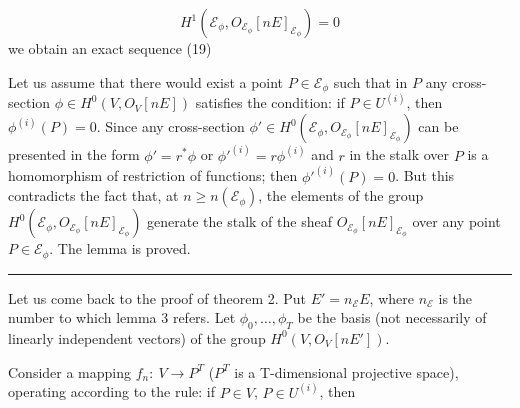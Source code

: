 \[
H^1(\mathcal E_\phi,O_{\mathcal E_\phi}[nE]_{\mathcal E_\phi})=0
\]
we obtain an exact sequence
\hfill(19)

Let us assume that there would exist a point $P\in\mathcal E_\phi$ such that in $P$ any cross-section $\phi\in H^0(V,O_V[nE])$ satisfies the condition: if $P\in U^{(i)}$, then $\phi^{(i)}(P)=0$. Since any cross-section $\phi'\in H^0(\mathcal E_\phi,O_{\mathcal E_\phi}[nE]_{\mathcal E_\phi})$ can be presented in the form $\phi'=r^*\phi$ or $\phi'^{(i)}=r\phi^{(i)}$ and $r$ in the stalk over $P$ is a homomorphism of restriction of functions; then $\phi'^{(i)}(P)=0$. But this contradicts the fact that, at $n\ge n(\mathcal E_\phi)$, the elements of the group $H^0(\mathcal E_\phi,O_{\mathcal E_\phi}[nE]_{\mathcal E_\phi})$ generate the stalk of the sheaf $O_{\mathcal E_\phi}[nE]_{\mathcal E_\phi}$ over any point $P\in\mathcal E_\phi$. The lemma is proved.\ \rule{0.5em}{1em}

Let us come back to the proof of theorem 2. Put $E'=n_{\mathcal E}E$, where $n_{\mathcal E}$ is the number to which lemma 3 refers. Let $\phi_0,\ldots,\phi_T$ be the basis (not necessarily of linearly independent vectors) of the group $H^0(V,O_V[nE'])$.

Consider a mapping $f_n:\ V\to P^T$ ($P^T$ is a T-dimensional projective space), operating according to the rule: if $P\in V$, $P\in U^{(i)}$, then
